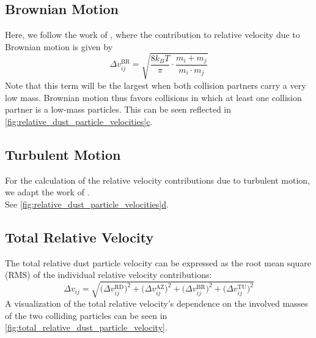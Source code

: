     \subsection{Brownian Motion}

        Here, we follow the work of \cite{dullemond_dominik_2004}, where the contribution to 
        relative velocity due to Brownian motion is given by
        \begin{equation}
            \Delta v_{ij}^\text{BR}
            =\sqrt{\frac{8k_BT}{\pi}\cdot\frac{m_i+m_j}{m_i\cdot m_j}}
        \end{equation}
        Note that this term will be the largest when both collision partners carry a very low mass.
        Brownian motion thus favors collisions in which at least one collision partner is a 
        low-mass particles. This can be seen reflected in 
        \hyperref[fig:relative_dust_particle_velocities]{
        \cref*{fig:relative_dust_particle_velocities}c}.

    \subsection{Turbulent Motion}

        For the calculation of the relative velocity contributions due to turbulent motion, we 
        adapt the work of \cite{ormel_cuzzi_2007}. \\

        See \hyperref[fig:relative_dust_particle_velocities]
        {\cref*{fig:relative_dust_particle_velocities}d}.

    \subsection{Total Relative Velocity}

        The total relative dust particle velocity can be expressed as the root mean square (RMS) of 
        the individual relative velocity contributions:
        \begin{equation}
            \Delta v_{ij}
                = \sqrt{
                    \big(\Delta v^\text{RD}_{ij}\big)^2
                    + \big(\Delta v^\text{AZ}_{ij}\big)^2
                    + \big(\Delta v^\text{BR}_{ij}\big)^2
                    + \big(\Delta v^\text{TU}_{ij}\big)^2
                }
        \end{equation}
        A visualization of the total relative velocity's dependence on the involved masses of the
        two colliding particles can be seen in \cref{fig:total_relative_dust_particle_velocity}.

